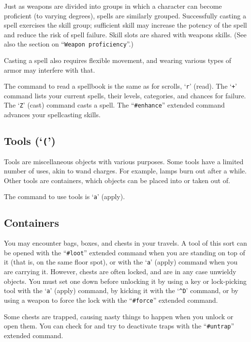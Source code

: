Just as weapons are divided into groups in which a character can become
proficient (to varying degrees), spells are similarly grouped.
Successfully casting a spell exercises the skill group; sufficient skill
may increase the potency of the spell and reduce the risk of spell failure.
Skill slots are shared with weapons skills.  (See also the section on
``{\tt Weapon proficiency}''.)

Casting a spell also requires flexible movement, and wearing various types
of armor may interfere with that.

The command to read a spellbook is the same as for scrolls, `{\tt r}'
(read).  The `{\tt +}' command lists your current spells, their levels,
categories, and chances for failure.  
The `{\tt Z}' (cast) command casts a spell.
The ``{\tt \#enhance}'' extended command advances your spellcasting skills.
\subsection*{Tools (`{\tt (}')}


Tools are miscellaneous objects with various purposes.  Some tools
have a limited number of uses, akin to wand charges.  For example, lamps burn
out after a while.  Other tools are containers, which objects can
be placed into or taken out of.

The command to use tools is `{\tt a}' (apply).
\subsection*{Containers}


You may encounter bags, boxes, and chests in your travels.  A tool of
this sort can be opened with the ``{\tt \#loot}'' extended command when
you are standing on top of it (that is, on the same floor spot),
or with the `{\tt a}' (apply) command when you are carrying it.  However,
chests are often locked, and are in any case unwieldy objects.
You must set one down before unlocking it by
using a key or lock-picking tool with the `{\tt a}' (apply) command,
by kicking it with the `{\tt \^{}D}' command,
or by using a weapon to force the lock with the ``{\tt \#force}'' extended command.

Some chests are trapped, causing nasty things to happen when you
unlock or open them.  You can check for and try to deactivate traps
with the ``{\tt \#untrap}'' extended command.
